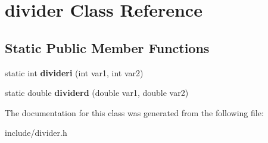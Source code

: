 \hypertarget{classdivider}{}\section{divider Class Reference}
\label{classdivider}
\subsection*{Static Public Member Functions}
\begin{DoxyCompactItemize}
\item 
\mbox{\label{classdivider_a0e66ef52ed97069f741241560107a8fa}} 
static int {\bfseries divideri} (int var1, int var2)
\item 
\mbox{\label{classdivider_a88d4fd11d1d0c14d92ca4c411dd82bc5}} 
static double {\bfseries dividerd} (double var1, double var2)
\end{DoxyCompactItemize}


The documentation for this class was generated from the following file\+:\begin{DoxyCompactItemize}
\item 
include/divider.\+h\end{DoxyCompactItemize}
